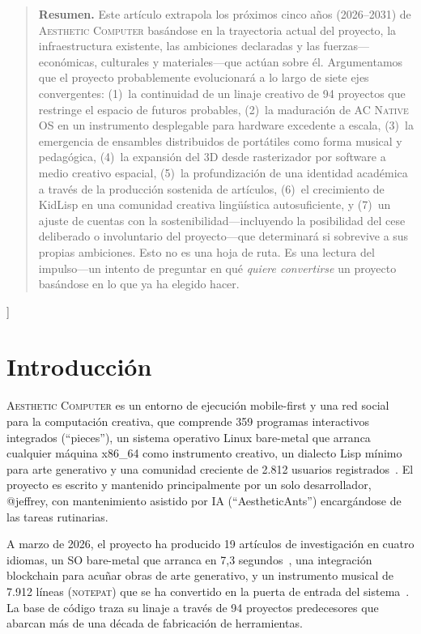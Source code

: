 \documentclass[10pt,letterpaper,twocolumn]{article}
\newcommand{\ac}{\textsc{Aesthetic Computer}}
\newcommand{\acos}{\textsc{AC Native OS}}
\newcommand{\np}{\textsc{notepat}}
\begin{document}
{\begin{quote}
\small\noindent\textbf{Resumen.}
Este artículo extrapola los próximos cinco años (2026--2031) de \ac{} basándose en la trayectoria actual del proyecto, la infraestructura existente, las ambiciones declaradas y las fuerzas---económicas, culturales y materiales---que actúan sobre él. Argumentamos que el proyecto probablemente evolucionará a lo largo de siete ejes convergentes: (1)~la continuidad de un linaje creativo de 94 proyectos que restringe el espacio de futuros probables, (2)~la maduración de \acos{} en un instrumento desplegable para hardware excedente a escala, (3)~la emergencia de ensambles distribuidos de portátiles como forma musical y pedagógica, (4)~la expansión del 3D desde rasterizador por software a medio creativo espacial, (5)~la profundización de una identidad académica a través de la producción sostenida de artículos, (6)~el crecimiento de KidLisp en una comunidad creativa lingüística autosuficiente, y (7)~un ajuste de cuentas con la sostenibilidad---incluyendo la posibilidad del cese deliberado o involuntario del proyecto---que determinará si sobrevive a sus propias ambiciones. Esto no es una hoja de ruta. Es una lectura del impulso---un intento de preguntar en qué \emph{quiere convertirse} un proyecto basándose en lo que ya ha elegido hacer.
\end{quote}
\vspace{0.5em}
}]


\section{Introducción}

\ac{} es un entorno de ejecución mobile-first y una red social para la computación creativa, que comprende 359 programas interactivos integrados (``pieces''), un sistema operativo Linux bare-metal que arranca cualquier máquina x86\_64 como instrumento creativo, un dialecto Lisp mínimo para arte generativo y una comunidad creciente de 2.812 usuarios registrados~\citep{scudder2026ac}. El proyecto es escrito y mantenido principalmente por un solo desarrollador, @jeffrey, con mantenimiento asistido por IA (``AestheticAnts'') encargándose de las tareas rutinarias.

A marzo de 2026, el proyecto ha producido 19 artículos de investigación en cuatro idiomas, un SO bare-metal que arranca en 7,3 segundos~\citep{scudder2026os}, una integración blockchain para acuñar obras de arte generativo, y un instrumento musical de 7.912 líneas (\np{}) que se ha convertido en la puerta de entrada del sistema~\citep{scudder2026notepat}. La base de código traza su linaje a través de 94 proyectos predecesores que abarcan más de una década de fabricación de herramientas.
\end{document}
